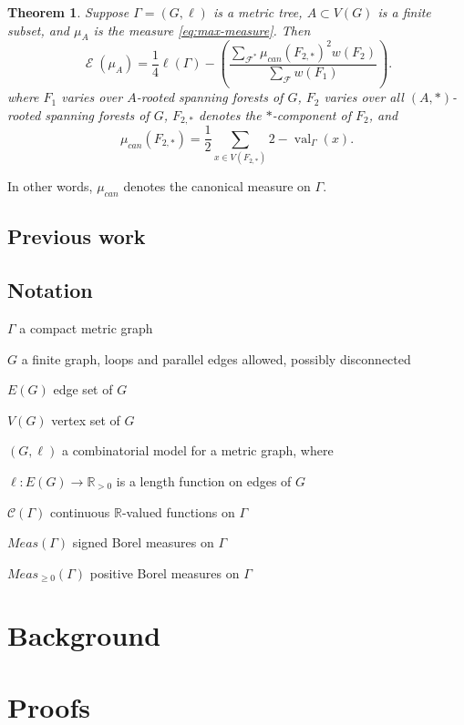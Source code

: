 \documentclass{amsart}
\newtheorem{thm}{Theorem}
\theoremstyle{definition}
\newcommand{\RR}{\mathbb{R}}
\newcommand{\cC}{\mathcal{C}}
\newcommand{\cE}{\mathcal{E}}
\DeclareMathOperator{\energy}{\cE}
\DeclareMathOperator{\val}{val}
\begin{document}
\begin{thm}\label{thm:max-capacity}
Suppose $\Gamma = (G,\ell)$ is a metric tree, $A \subset V(G)$ is a finite subset,
and $\mu_A$ is the measure \eqref{eq:max-measure}.
Then
\begin{equation}\label{eq:max-capacity}
\energy(\mu_A) = \frac14 \ell(\Gamma) - \left( \frac{ \sum_{\mathcal F^*} \mu_{can}(F_{2,*})^2 w(F_2)}{\sum_{\mathcal F} w(F_1) } \right).
\end{equation}
where 
$F_1$ varies over $A$-rooted spanning forests of $G$,
$F_2$ varies over all $(A,*)$-rooted spanning forests of $G$,
$F_{2,*}$ denotes the $*$-component of $F_2$, 
and
\begin{equation}
\mu_{can}(F_{2,*}) 
= \frac12 \sum_{x \in V( F_{2,*})} {2 - \val_\Gamma(x)}.
\end{equation}
\end{thm}
In other words, 
$\mu_{can}$ denotes the canonical measure on $\Gamma$.


\subsection{Previous work} 



\subsection{Notation}

$\Gamma$ a compact metric graph

$G$ a finite graph, 
loops and parallel edges allowed,
possibly disconnected

$E(G)$ edge set of $G$

$V(G)$ vertex set of $G$

$(G,\ell)$ a combinatorial model for a metric graph,
where 

$\ell : E(G) \to \RR_{>0}$
is a length function on edges of $G$

$\cC(\Gamma)$ continuous $\RR$-valued functions on $\Gamma$

$Meas(\Gamma)$ signed Borel measures on $\Gamma$

$Meas_{\geq 0}(\Gamma)$ positive Borel measures on $\Gamma$

\section{Background}


\section{Proofs}
\end{document}
